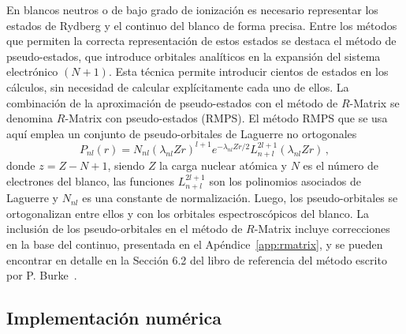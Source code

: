 En blancos neutros o de bajo grado de ionización es necesario 
representar los estados de Rydberg y el continuo del blanco de forma 
precisa. Entre los métodos que permiten la correcta representación de 
estos estados se destaca el método de pseudo-estados, que introduce 
orbitales analíticos en la expansión del sistema electrónico $(N+1)$. 
Esta técnica permite introducir cientos de estados en los cálculos, sin 
necesidad de calcular explícitamente cada uno de ellos. 
La combinación de la aproximación de pseudo-estados con el método de 
$R$-Matrix se denomina $R$-Matrix con pseudo-estados (RMPS). El método 
RMPS que se usa aquí emplea un conjunto de pseudo-orbitales de Laguerre 
no ortogonales 
\begin{equation}
P_{nl}(r) = N_{nl}(\lambda_{nl}Zr)^{l+1} e^{-\lambda_{nl}Zr/2} 
L_{n+l}^{2l+1}(\lambda_{nl}Zr)\,,
\label{eq:pseudo}
\end{equation}
donde $z=Z-N+1$, siendo $Z$ la carga nuclear atómica y $N$ es el número 
de electrones del blanco, las funciones $L_{n+l}^{2l+1}$ son los 
polinomios asociados de Laguerre y $N_{nl}$ es una constante de 
normalización. Luego, los pseudo-orbitales se ortogonalizan entre ellos
y con los orbitales espectroscópicos del blanco. La inclusión de los 
pseudo-orbitales en el método de $R$-Matrix incluye correcciones en la 
base del continuo, presentada en el Apéndice~\ref{app:rmatrix}, y se 
pueden encontrar en detalle en la Sección 6.2 del libro de referencia 
del método escrito por P. Burke~\cite{Burke:11}.

\subsection{Implementación numérica}

